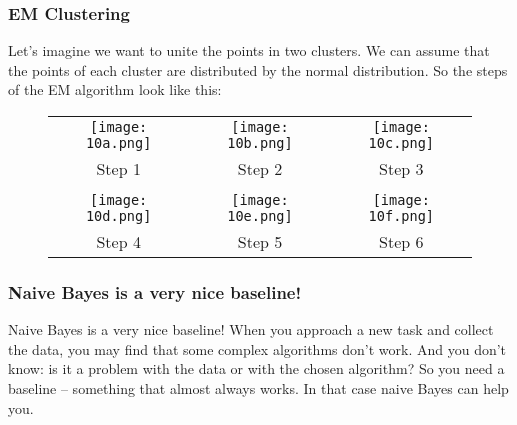 \subsubsection*{EM Clustering}

Let's imagine we want to unite the points in two clusters. We can assume that the points of each cluster are distributed by the normal distribution. So the steps of the EM algorithm look like this:\\
\begin{figure}[H]
  \centering
  \begin{tabular}{ccc}
    \texttt{[image: 10a.png]} & \hspace{0.5cm}
    \texttt{[image: 10b.png]} & \hspace{0.5cm}
    \texttt{[image: 10c.png]} \\
    Step 1 & Step 2 & Step 3 \\
    & & \\
    \texttt{[image: 10d.png]} & \hspace{0.5cm}
    \texttt{[image: 10e.png]} & \hspace{0.5cm}
    \texttt{[image: 10f.png]} \\
    Step 4 & Step 5 & Step 6 \\
  \end{tabular}
\end{figure}

\subsubsection*{Naive Bayes is a very nice baseline!}

Naive Bayes is a very nice baseline! When you approach a new task and collect the data, you may find that some complex algorithms don't work. And you don't know: is it a problem with the data or with the chosen algorithm? So you need a baseline -- something that almost always works. In that case naive Bayes can help you.